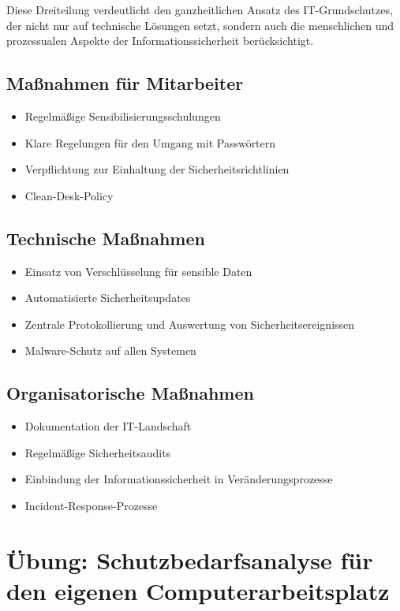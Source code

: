 \documentclass{orgstandard}
\begin{document}
\begin{NOTES}
Diese Dreiteilung verdeutlicht den ganzheitlichen Ansatz des IT-Grundschutzes, der nicht nur auf technische Lösungen setzt, sondern auch die menschlichen und prozessualen Aspekte der Informationssicherheit berücksichtigt. 
\end{NOTES}

\subsection{Maßnahmen für Mitarbeiter}
\label{sec:org1369914}
\begin{itemize}
\item Regelmäßige Sensibilisierungsschulungen
\item Klare Regelungen für den Umgang mit Passwörtern
\item Verpflichtung zur Einhaltung der Sicherheitsrichtlinien
\item Clean-Desk-Policy
\end{itemize}

\subsection{Technische Maßnahmen}
\label{sec:org53feafd}
\begin{itemize}
\item Einsatz von Verschlüsselung für sensible Daten
\item Automatisierte Sicherheitsupdates
\item Zentrale Protokollierung und Auswertung von Sicherheitsereignissen
\item Malware-Schutz auf allen Systemen
\end{itemize}

\subsection{Organisatorische Maßnahmen}
\label{sec:org364c114}
\begin{itemize}
\item Dokumentation der IT-Landschaft
\item Regelmäßige Sicherheitsaudits
\item Einbindung der Informationssicherheit in Veränderungsprozesse
\item Incident-Response-Prozesse
\end{itemize}



\section{Übung: Schutzbedarfsanalyse für den eigenen Computerarbeitsplatz}
\label{sec:orgfdec87e}
\end{document}

